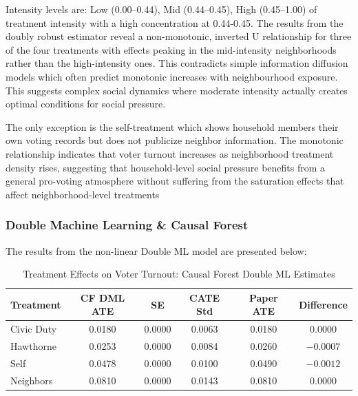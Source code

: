 \documentclass[11pt]{article}
\begin{document}
\begin{table}[H]
\centering
\caption{Treatment Effects by Neighborhood Intensity: Doubly Robust Estimates}
\label{tab:ate_by_intensity}

\end{table}



Intensity levels are: Low (0.00--0.44), Mid (0.44--0.45), High (0.45--1.00) of treatment intensity with a high concentration at 0.44-0.45. The results from the doubly robust estimator reveal a non-monotonic, inverted U relationship for three of the four treatments with effects peaking in the mid-intensity neighborhoods rather than the high-intensity ones. This contradicts simple information diffusion models which often predict monotonic increases with neighbourhood exposure. This suggests complex social dynamics where moderate intensity actually creates optimal conditions for social pressure. 

The only exception is the self-treatment which shows household members their own voting records but does not publicize neighbor information. The monotonic relationship indicates that voter turnout increases as neighborhood treatment density rises, suggesting that household-level social pressure benefits from a general pro-voting atmosphere without suffering from the saturation effects that affect neighborhood-level treatments

\subsubsection{Double Machine Learning \& Causal Forest}
 The results from the non-linear Double ML model are presented below:
    \begin{table}[H]
    \centering
    \caption{Treatment Effects on Voter Turnout: Causal Forest Double ML Estimates}
    \begin{tabular}{lccccc}
        \toprule
        Treatment & CF DML ATE & SE & CATE Std & Paper ATE & Difference \\
        \midrule
        Civic Duty & 0.0180 & 0.0000 & 0.0063 & 0.0180 & 0.0000 \\
        Hawthorne & 0.0253 & 0.0000 & 0.0084 & 0.0260 & $-0.0007$ \\
        Self & 0.0478 & 0.0000 & 0.0100 & 0.0490 & $-0.0012$ \\
        Neighbors & 0.0810 & 0.0000 & 0.0143 & 0.0810 & 0.0000 \\
        \bottomrule
    \end{tabular}
    \label{tab:cf_dml_estimates}
    \end{table}
\end{document}

